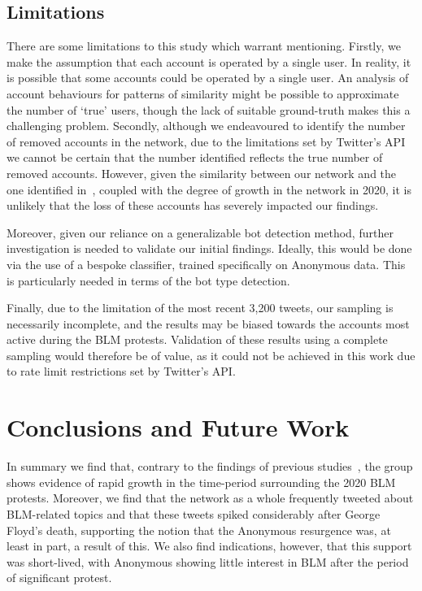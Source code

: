 \documentclass[letterpaper]{article}
\begin{document}
\vspace{-2.26mm}
\subsection{Limitations}

There are some limitations to this study which warrant mentioning. Firstly, we make the assumption that each account is operated by a single user. In reality, it is possible that some accounts could be operated by a single user. An analysis of account behaviours for patterns of similarity might be possible to approximate the number of `true' users, though the lack of suitable ground-truth makes this a challenging problem.  Secondly, although we endeavoured to identify the number of removed accounts in the network, due to the limitations set by Twitter's API we cannot be certain that the number identified reflects the true number of removed accounts. However, given the similarity between our network and the one identified in~\cite{Jones2020}, coupled with the degree of growth in the network in 2020, it is unlikely that the loss of these accounts has severely impacted our findings.

Moreover, given our reliance on a generalizable bot detection method, further investigation is needed to validate our initial findings. Ideally, this would be done via the use of a bespoke classifier, trained specifically on Anonymous data. This is particularly needed in terms of the bot type detection.

Finally, due to the limitation of the most recent 3,200 tweets, our sampling is necessarily incomplete, and the results may be biased towards the accounts most active during the BLM protests. Validation of these results using a complete sampling would therefore be of value, as it could not be achieved in this work due to rate limit restrictions set by Twitter's API.

\vspace{-1.97mm}
\section{Conclusions and Future Work}

In summary we find that, contrary to the findings of previous studies~\cite{Jones2020,Uitermark2017}, the group shows evidence of rapid growth in the time-period surrounding the 2020 BLM protests. Moreover, we find that the network as a whole frequently tweeted about BLM-related topics and that these tweets spiked considerably after George Floyd's death, supporting the notion that the Anonymous resurgence was, at least in part, a result of this. We also find indications, however, that this support was short-lived, with Anonymous showing little interest in BLM after the period of significant protest.
\end{document}
